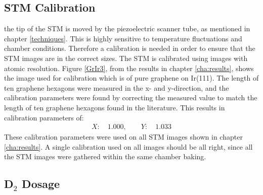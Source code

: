 \subsection{STM Calibration}
the tip of the STM is moved by the piezoelectric scanner tube, as mentioned in chapter \ref{techniques}. This is highly sensitive to temperature fluctuations and chamber conditions. Therefore a calibration is needed in order to ensure that the STM images are in the correct sizes. The STM is calibrated using images with atomic resolution. Figure \ref{GrIr3}, from the results in chapter \ref{cha:results}, shows the image used for calibration which is of pure graphene on Ir(111). The length of ten graphene hexagons were measured in the x- and y-direction, and the calibration parameters were found by correcting the measured value to match the length of ten graphene hexagons found in the literature. This results in calibration parameters of:
\begin{align}
X: \quad 1.000, \qquad Y: \quad 1.033
\end{align}
These calibration parameters were used on all STM images shown in chapter \ref{cha:results}. A single calibration used on all images should be all right, since all the STM images were gathered within the same chamber baking.

\subsection{D$_2$ Dosage}


